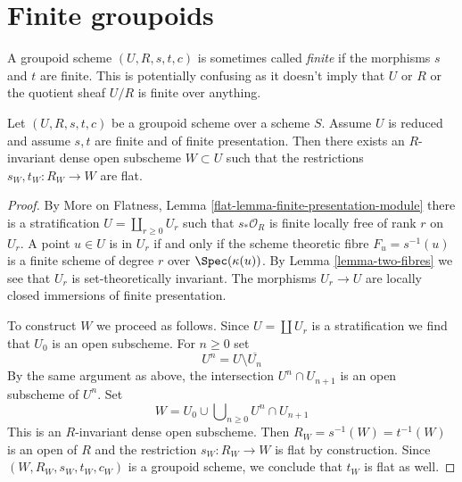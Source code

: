 \section{Finite groupoids}
\label{section-finite-groupoids}

\noindent
A groupoid scheme $(U, R, s, t, c)$ is sometimes called {\it finite} if the
morphisms $s$ and $t$ are finite. This is potentially confusing as it doesn't
imply that $U$ or $R$ or the quotient sheaf $U/R$ is finite over anything.

\begin{lemma}
\label{lemma-finite-reduced-flat-over-open}
Let $(U, R, s, t, c)$ be a groupoid scheme over a scheme $S$.
Assume $U$ is reduced and assume $s, t$ are finite and of finite
presentation. Then there exists an $R$-invariant dense open subscheme
$W \subset U$ such that the restrictions $s_W, t_W : R_W \to W$ are flat.
\end{lemma}

\begin{proof}
By More on Flatness, Lemma \ref{flat-lemma-finite-presentation-module}
there is a stratification $U = \coprod_{r \geq 0} U_r$ such that
$s_*\mathcal{O}_R$ is finite locally free of rank $r$ on $U_r$.
A point $u \in U$ is in $U_r$ if and only if the scheme theoretic
fibre $F_u = s^{-1}(u)$ is a finite scheme of degree $r$ over
$\Spec(\kappa(u))$. By Lemma \ref{lemma-two-fibres} we see that
$U_r$ is set-theoretically invariant. The morphisms $U_r \to U$
are locally closed immersions of finite presentation.

\medskip\noindent
To construct $W$ we proceed as follows. Since $U = \coprod U_r$
is a stratification we find that $U_0$ is an open subscheme.
For $n \geq 0$ set
$$
U^n = U \setminus \overline{U_n}
$$
By the same argument as above, the intersection $U^n \cap U_{n + 1}$
is an open subscheme of $U^n$. Set
$$
W = U_0 \cup \bigcup\nolimits_{n \geq 0} U^n \cap U_{n + 1}
$$
This is an $R$-invariant dense open subscheme. Then
$R_W = s^{-1}(W) = t^{-1}(W)$
is an open of $R$ and the restriction $s_W : R_W \to W$ is flat by
construction. Since $(W, R_W, s_W, t_W, c_W)$ is a groupoid scheme,
we conclude that $t_W$ is flat as well.
\end{proof}























